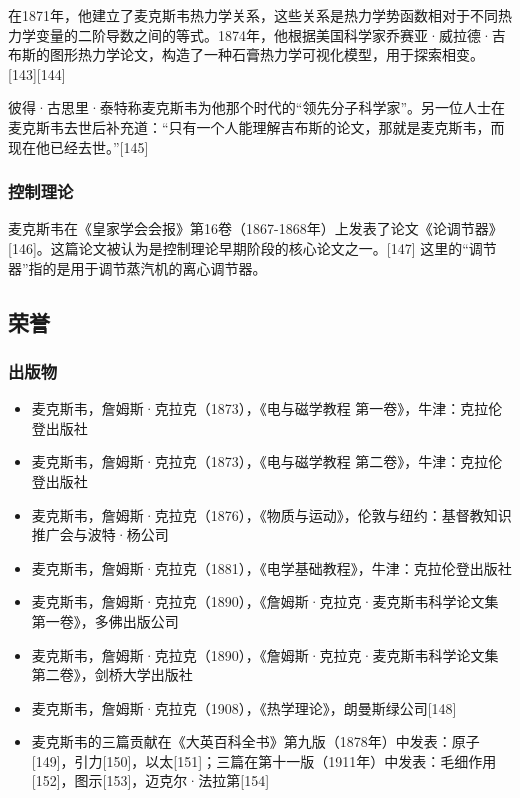 在1871年，他建立了麦克斯韦热力学关系，这些关系是热力学势函数相对于不同热力学变量的二阶导数之间的等式。1874年，他根据美国科学家乔赛亚·威拉德·吉布斯的图形热力学论文，构造了一种石膏热力学可视化模型，用于探索相变。[143][144]

彼得·古思里·泰特称麦克斯韦为他那个时代的“领先分子科学家”。另一位人士在麦克斯韦去世后补充道：“只有一个人能理解吉布斯的论文，那就是麦克斯韦，而现在他已经去世。”[145]
\subsubsection{控制理论}  
麦克斯韦在《皇家学会会报》第16卷（1867-1868年）上发表了论文《论调节器》[146]。这篇论文被认为是控制理论早期阶段的核心论文之一。[147] 这里的“调节器”指的是用于调节蒸汽机的离心调节器。
\subsection{荣誉}  
\subsubsection{出版物}
\begin{itemize}
\item 麦克斯韦，詹姆斯·克拉克（1873），《电与磁学教程 第一卷》，牛津：克拉伦登出版社  
\item 麦克斯韦，詹姆斯·克拉克（1873），《电与磁学教程 第二卷》，牛津：克拉伦登出版社  
\item 麦克斯韦，詹姆斯·克拉克（1876），《物质与运动》，伦敦与纽约：基督教知识推广会与波特·杨公司  
\item 麦克斯韦，詹姆斯·克拉克（1881），《电学基础教程》，牛津：克拉伦登出版社  
\item 麦克斯韦，詹姆斯·克拉克（1890），《詹姆斯·克拉克·麦克斯韦科学论文集 第一卷》，多佛出版公司  
\item 麦克斯韦，詹姆斯·克拉克（1890），《詹姆斯·克拉克·麦克斯韦科学论文集 第二卷》，剑桥大学出版社  
\item 麦克斯韦，詹姆斯·克拉克（1908），《热学理论》，朗曼斯绿公司[148]  
\item 麦克斯韦的三篇贡献在《大英百科全书》第九版（1878年）中发表：原子[149]，引力[150]，以太[151]；三篇在第十一版（1911年）中发表：毛细作用[152]，图示[153]，迈克尔·法拉第[154]
\end{itemize}
